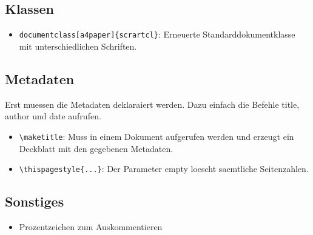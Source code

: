 \documentclass[11pt]{article}
\begin{document}
\subsection{Klassen}
\begin{itemize}
  \item \verb|documentclass[a4paper]{scrartcl}|: Erneuerte Standarddokumentklasse mit unterschiedlichen Schriften.
\end{itemize}

\subsection{Metadaten}
Erst muessen die Metadaten deklaraiert werden. Dazu einfach die Befehle title, author und date aufrufen. 
\begin{itemize}
  \item \verb|\maketitle|: Muss in einem Dokument aufgerufen werden und erzeugt ein Deckblatt mit den gegebenen Metadaten.
  \item \verb|\thispagestyle{...}|: Der Parameter empty loescht saemtliche Seitenzahlen. 
\end{itemize}

\subsection{Sonstiges}
\begin{itemize} 
  \item Prozentzeichen zum Auskommentieren 
\end{itemize}
\end{document}
